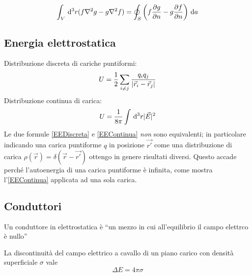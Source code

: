 \documentclass[../main.tex]{subfiles}
\begin{document}
\begin{theorem}
  \label{Green2}
  \begin{equation}
  \int_V \,\mathrm d^3 r (f \nabla^2 g - g \nabla^2 f) = \oint_S \left( f \frac{\partial g}{\partial n} - g \frac{\partial f}{\partial n} \right) \,\mathrm d a
  \end{equation}
\end{theorem}

\subsection{Energia elettrostatica}\label{EnergiaElettrostatica}
Distribuzione discreta di cariche puntiformi:
\begin{equation}
  \label{EEDiscreta}
  U= \frac{1}{2} \sum_{i\neq j} \frac{q_iq_j}{\lvert\vec r_i -\vec r_j\rvert}
\end{equation}
Distribuzione continua di carica:
\begin{equation}
  \label{EEContinua}
  U= \frac{1}{8\pi} \int \,\mathrm d^3 r \lvert\vec E\rvert^2
\end{equation}
Le due formule \cref{EEDiscreta} e \cref{EEContinua} \emph{non} sono equivalenti; in particolare indicando una carica puntiforme $q$ in posizione $\vec {r'}$ come una distribuzione di carica $\rho(\vec r)=\delta(\vec r - \vec {r'})$ ottengo in genere risultati diversi. Questo accade perch\'e l'autoenergia di una carica puntiforme \`e infinita, come mostra l'\cref{EEContinua} applicata ad una sola carica.

\subsection{Conduttori}\label{Conduttori}
\begin{definition}[Conduttore]
  Un conduttore in elettrostatica \`e ``un mezzo in cui all'equilibrio il campo elettrco \`e nullo'' 
\end{definition}
La discontinuit\`a del campo elettrico a cavallo di un piano carico con densit\`a superficiale $\sigma$ vale
\begin{equation}
  \label{DiscontinuitaSigma}
  \Delta E = 4 \pi \sigma
\end{equation}
\end{document}
